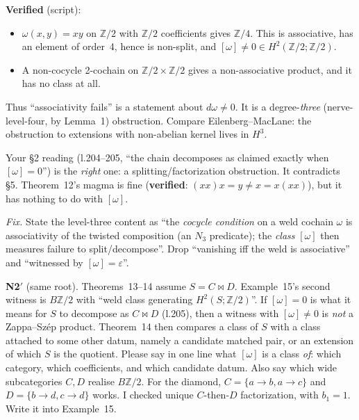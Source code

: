 \documentclass[11pt]{article}
\newcommand{\Z}{\mathbb{Z}}
\begin{document}
\begin{enumerate}[label=\textbf{N\arabic*},leftmargin=*]
\textbf{Verified} (script):
\begin{itemize}[leftmargin=1.2em]
\item $\omega(x,y)=xy$ on $\Z/2$ with $\Z/2$ coefficients gives $\Z/4$. This is associative, has
an element of order~4, hence is non-split, and $[\omega]\neq0\in H^2(\Z/2;\Z/2)$.
\item A non-cocycle 2-cochain on $\Z/2\times\Z/2$ gives a non-associative product, and it has no
class at all.
\end{itemize}
Thus ``associativity fails'' is a statement about $d\omega\neq0$. It is a degree-\emph{three}
(nerve-level-four, by Lemma~1) obstruction. Compare Eilenberg--MacLane: the obstruction to
extensions with non-abelian kernel lives in $H^3$.

Your \S2 reading (l.204--205, ``the chain decomposes as claimed exactly when $[\omega]=0$'') is the
\emph{right} one: a splitting/factorization obstruction. It contradicts \S5. Theorem~12's magma is
fine (\textbf{verified}: $(xx)x=y\neq x=x(xx)$), but it has nothing to do with $[\omega]$.

\emph{Fix.} State the level-three content as ``the \emph{cocycle condition} on a weld cochain
$\omega$ is associativity of the twisted composition (an $N_3$ predicate); the \emph{class}
$[\omega]$ then measures failure to split/decompose''. Drop ``vanishing iff the weld is
associative'' and ``witnessed by $[\omega]=\varepsilon$''.

\textbf{N2$'$} (same root). Theorems~13--14 assume $S=C\bowtie D$. Example~15's second witness is
$B\Z/2$ with ``weld class generating $H^2(S;\Z/2)$''. If $[\omega]=0$ is what it means for $S$ to
decompose as $C\bowtie D$ (l.205), then a witness with $[\omega]\neq0$ is \emph{not} a Zappa--Szép
product. Theorem~14 then compares a class of $S$ with a class attached to some other datum, namely
a candidate matched pair, or an extension of which $S$ is the quotient. Please say in one line
what $[\omega]$ is a class \emph{of}: which category, which coefficients, and which candidate
datum. Also say which wide subcategories $C,D$ realise $B\Z/2$. For the diamond, $C=\{a\to b,a\to
c\}$ and $D=\{b\to d,c\to d\}$ works. I checked unique $C$-then-$D$ factorization, with $b_1=1$.
Write it into Example~15.


\end{enumerate}
\end{document}
